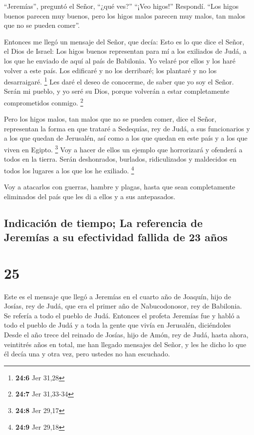  ``Jeremías'', preguntó el Señor, ``¿qué ves?'' ``¡Veo
higos!'' Respondí. ``Los higos buenos parecen muy buenos, pero los higos
malos parecen muy malos, tan malos que no se pueden comer''.

 Entonces me llegó un mensaje del Señor, que decía:
 Esto es lo que dice el Señor, el Dios de Israel: Los
higos buenos representan para mí a los exiliados de Judá, a los que he
enviado de aquí al país de Babilonia.  Yo velaré por ellos
y los haré volver a este país. Los edificaré y no los derribaré; los
plantaré y no los desarraigaré. \footnote{\textbf{24:6} Jer 31,28}
 Les daré el deseo de conocerme, de saber que yo soy el
Señor. Serán mi pueblo, y yo seré su Dios, porque volverán a estar
completamente comprometidos conmigo. \footnote{\textbf{24:7} Jer
  31,33-34}

 Pero los higos malos, tan malos que no se pueden comer,
dice el Señor, representan la forma en que trataré a Sedequías, rey de
Judá, a sus funcionarios y a los que quedan de Jerusalén, así como a los
que quedan en este país y a los que viven en Egipto. \footnote{\textbf{24:8}
  Jer 29,17}  Voy a hacer de ellos un ejemplo que
horrorizará y ofenderá a todos en la tierra. Serán deshonrados,
burlados, ridiculizados y maldecidos en todos los lugares a los que los
he exiliado. \footnote{\textbf{24:9} Jer 29,18}

 Voy a atacarlos con guerras, hambre y plagas, hasta que
sean completamente eliminados del país que les di a ellos y a sus
antepasados.

\hypertarget{indicaciuxf3n-de-tiempo-la-referencia-de-jeremuxedas-a-su-efectividad-fallida-de-23-auxf1os}{%
\subsection{Indicación de tiempo; La referencia de Jeremías a su
efectividad fallida de 23
años}\label{indicaciuxf3n-de-tiempo-la-referencia-de-jeremuxedas-a-su-efectividad-fallida-de-23-auxf1os}}

\hypertarget{section-24}{%
\section{25}\label{section-24}}

 Este es el mensaje que llegó a Jeremías en el cuarto año
de Joaquín, hijo de Josías, rey de Judá, que era el primer año de
Nabucodonosor, rey de Babilonia. Se refería a todo el pueblo de Judá.
 Entonces el profeta Jeremías fue y habló a todo el pueblo
de Judá y a toda la gente que vivía en Jerusalén, diciéndoles
 Desde el año trece del reinado de Josías, hijo de Amón,
rey de Judá, hasta ahora, veintitrés años en total, me han llegado
mensajes del Señor, y les he dicho lo que él decía una y otra vez, pero
ustedes no han escuchado.

